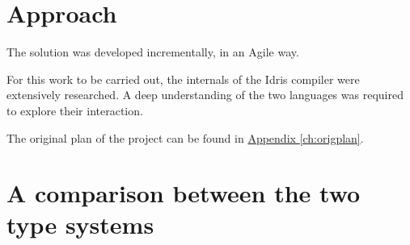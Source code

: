 \section{Approach}

The solution was developed incrementally, in an Agile way.

For this work to be carried out, the internals of the Idris compiler
were extensively researched. A deep understanding of the two languages
was required to explore their interaction.


The original plan of the project can be found in
\hyperref[ch:origplan]{Appendix \ref{ch:origplan}}.

\section{A comparison between the two type systems}